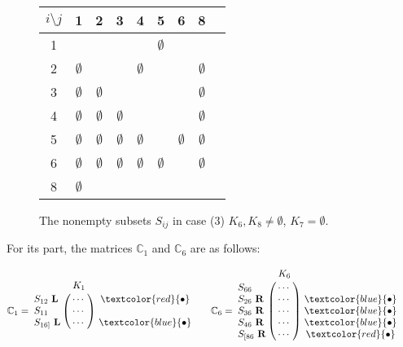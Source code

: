 \documentclass[12pt]{book}
\theoremstyle{plain}
\theoremstyle{remark}
\begin{document}
\begin{figure}[h!]	 
\begin{center}
	\begin{tabular}{ c | c c c c c c c c} 
		 \hline
		 $i\setminus j$ & 1 & 2 & 3 & 4 & 5 & 6 & 8 \\ 
		  \hline
		 1 & \checkmark & \checkmark & \checkmark & \checkmark & $\emptyset$ & \checkmark & \checkmark \\ 
		 2 & $\emptyset$ & \checkmark & \checkmark & $\emptyset$ & \checkmark & \checkmark & $\emptyset$ \\
 		 3 & $\emptyset$ & $\emptyset$ & \checkmark & \checkmark & \checkmark & \checkmark & $\emptyset$  \\
		 4 & $\emptyset$ & $\emptyset$ & $\emptyset$ & \checkmark & \checkmark & \checkmark & $\emptyset$ \\
		 5 & $\emptyset$ & $\emptyset$ & $\emptyset$ & $\emptyset$ & \checkmark & $\emptyset$ & $\emptyset$ \\
		 6 & $\emptyset$  & $\emptyset$  & $\emptyset$  & $\emptyset$  & $\emptyset$ & \checkmark & $\emptyset$ \\
		8 & $\emptyset$ & \checkmark & \checkmark & \checkmark & \checkmark & \checkmark & \checkmark \\
	\end{tabular}
\end{center} 
\caption{The nonempty subsets $S_{ij}$ in case (3) $K_6, K_8 \neq \emptyset$, $K_7 = \emptyset$.} \label{fig:tabla_co4tent_3}
\end{figure}
For its part, the matrices $\mathbb C_1$ and $\mathbb C_6$ are as follows:

\[  \mathbb C_1 = \bordermatrix{ & K_1\cr
				S_{12}\ \textbf{L} & \cdots \cr
		         S_{11}\            & \cdots \cr
                S_{16]}\ \textbf{L} & \cdots }\
                \begin{matrix}
                \textcolor{red}{\bullet} \\ \\ \textcolor{blue}{\bullet} \\ 
                \end{matrix} \qquad
     \mathbb C_6 = \bordermatrix{ & K_6\cr
                S_{66}\            & \cdots \cr
                S_{26}\ \textbf{R} & \cdots \cr
                S_{36}\ \textbf{R} & \cdots \cr
                S_{46}\ \textbf{R} & \cdots \cr
                S_{[86}\ \textbf{R} & \cdots }\
                \begin{matrix}
                \\ \\  \textcolor{blue}{\bullet} \\  \textcolor{blue}{\bullet} \\ \textcolor{blue}{\bullet} \\ \textcolor{red}{\bullet} \\ \\ 
                \end{matrix}  \qquad \]
\end{document}
